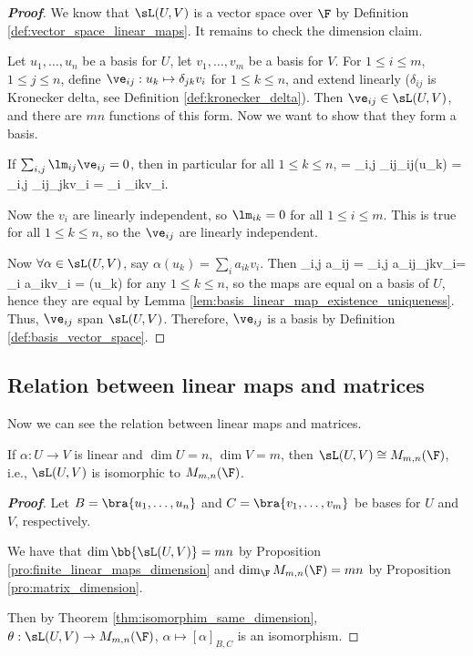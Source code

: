 \begin{proof}[\bf Proof]
We know that $\sL(U, V )$ is a vector space over $\F$ by Definition \ref{def:vector_space_linear_maps}. It remains to check the dimension claim.

Let $u_1, \dots, u_n$ be a basis for $U$, let $v_1, \dots, v_m$ be a basis for $V$. For $1 \leq  i \leq  m$, $1 \leq  j \leq  n$, define $\ve_{ij} : u_k \mapsto \delta_{jk}v_i$ for $1 \leq  k \leq  n$, and extend linearly ($\delta_{ij}$ is Kronecker delta, see Definition \ref{def:kronecker_delta}). Then $\ve_{ij} \in \sL(U, V)$, and there are $mn$ functions of this form. Now we want to show that they form a basis.

If $\sum_{i,j} \lm_{ij}\ve_{ij} = 0$, then in particular for all $1 \leq  k \leq  n$,
 = \sum_{i,j} \lm_{ij}\ve_{ij}(u_k) = \sum_{i,j} \lm_{ij}\delta_{jk}v_i = \sum_i \lm_{ik}v_i.
\ee

Now the $v_i$ are linearly independent, so $\lm_{ik} = 0$ for all $1 \leq  i \leq  m$. This is true for all $1 \leq  k \leq  n$, so the $\ve_{ij}$ are linearly independent.

Now $\forall \alpha \in\sL(U, V)$, say $\alpha(u_k) = \sum_i a_{ik} v_i$. Then
\be%
\sum_{i,j} a_{ij} = \sum_{i,j} a_{ij}\delta_{jk}v_i= \sum_i a_{ik}v_i = \alpha(u_k)
\ee
for any $1 \leq  k \leq  n$, so the maps are equal on a basis of $U$, hence they are equal by Lemma \ref{lem:basis_linear_map_existence_uniqueness}. Thus, $\ve_{ij}$ span $\sL(U,V)$. Therefore, $\ve_{ij}$ is a basis by Definition \ref{def:basis_vector_space}.
\end{proof}

\subsection{Relation between linear maps and matrices}

Now we can see the relation between linear maps and matrices.

\begin{proposition}\label{pro:relation_linear_map_matrix}
If $\alpha : U \to V$ is linear and $\dim U = n$, $\dim V = m$, then $\sL(U, V) \cong M_{m,n}(\F)$, i.e., $\sL(U, V)$ is isomorphic to $M_{m,n}(\F)$.
\end{proposition}

\begin{proof}[\bf Proof]
Let $B = \bra{u_1, \dots, u_n}$ and $C = \bra{v_1, \dots, v_m}$ be bases for $U$ and $V$, respectively.

We have that $\dim \bb{\sL(U,V)} = mn$ by Proposition \ref{pro:finite_linear_maps_dimension} and $\dim_\F M_{m,n}(\F) = mn$ by Proposition \ref{pro:matrix_dimension}.

Then by Theorem \ref{thm:isomorphim_same_dimension}, $\theta : \sL(U, V) \to M_{m,n}(\F)$, $\alpha \mapsto [\alpha]_{B,C}$ is an isomorphism.
\end{proof}

